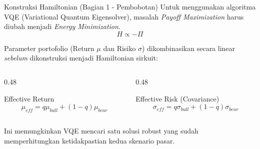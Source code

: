 \documentclass{beamer}
\begin{document}
\begin{frame}{Konstruksi Hamiltonian (Bagian 1 - Pembobotan)}
    Untuk menggunakan algoritma VQE (Variational Quantum Eigensolver), masalah \textit{Payoff Maximization} harus diubah menjadi \textit{Energy Minimization}.
    $$ H \propto -\Pi $$
    
    Parameter portofolio (Return $\mu$ dan Risiko $\sigma$) dikombinasikan secara linear \textit{sebelum} dikonstruksi menjadi Hamiltonian sirkuit:
    
    \begin{columns}
        \begin{column}{0.48\textwidth}
            \begin{block}{Effective Return}
            $$ \mu_{eff} = q\mu_{bull} + (1-q)\mu_{bear} $$
            \end{block}
        \end{column}
        \begin{column}{0.48\textwidth}
            \begin{block}{Effective Risk (Covariance)}
            $$ \sigma_{eff} = q\sigma_{bull} + (1-q)\sigma_{bear} $$
            \end{block}
        \end{column}
    \end{columns}
    
    \vspace{0.3cm}
    Ini memungkinkan VQE mencari satu solusi robust yang sudah memperhitungkan ketidakpastian kedua skenario pasar.
\end{frame}
\end{document}
